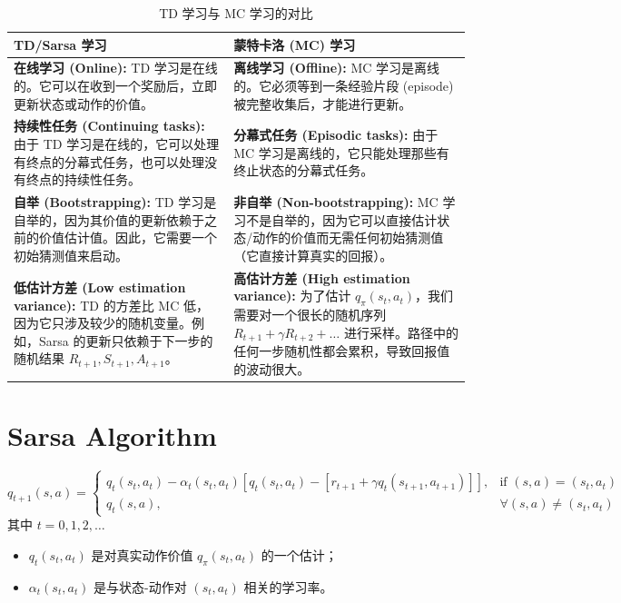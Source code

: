 \documentclass{article}
\begin{document}
\begin{table}[htbp] %
    \centering
    \caption{TD 学习与 MC 学习的对比}
    \label{tab:td_vs_mc_full}
    \begin{tabularx}{\textwidth}{XX} %
        \toprule
        \textbf{TD/Sarsa 学习} & \textbf{蒙特卡洛 (MC) 学习} \\
        \midrule
        \textbf{在线学习 (Online):} TD 学习是在线的。它可以在收到一个奖励后，立即更新状态或动作的价值。 & \textbf{离线学习 (Offline):} MC 学习是离线的。它必须等到一条经验片段 (episode) 被完整收集后，才能进行更新。 \\
        
        \addlinespace %
        
        \textbf{持续性任务 (Continuing tasks):} 由于 TD 学习是在线的，它可以处理有终点的分幕式任务，也可以处理没有终点的持续性任务。 & \textbf{分幕式任务 (Episodic tasks):} 由于 MC 学习是离线的，它只能处理那些有终止状态的分幕式任务。 \\
        
        \addlinespace
        
        \textbf{自举 (Bootstrapping):} TD 学习是自举的，因为其价值的更新依赖于之前的价值估计值。因此，它需要一个初始猜测值来启动。 & \textbf{非自举 (Non-bootstrapping):} MC 学习不是自举的，因为它可以直接估计状态/动作的价值而无需任何初始猜测值（它直接计算真实的回报）。 \\
        
        \addlinespace
        
        \textbf{低估计方差 (Low estimation variance):} TD 的方差比 MC 低，因为它只涉及较少的随机变量。例如，Sarsa 的更新只依赖于下一步的随机结果 $R_{t+1}, S_{t+1}, A_{t+1}$。 & \textbf{高估计方差 (High estimation variance):} 为了估计 $q_\pi(s_t, a_t)$，我们需要对一个很长的随机序列 $R_{t+1} + \gamma R_{t+2} + \dots$ 进行采样。路径中的任何一步随机性都会累积，导致回报值的波动很大。 \\
        \bottomrule
    \end{tabularx}
\end{table}
\section{Sarsa Algorithm}
\[
q_{t+1}(s, a) =
\begin{cases}
    q_t(s_t, a_t) - \alpha_t(s_t, a_t) \left[ q_t(s_t, a_t) - [r_{t+1} + \gamma q_t(s_{t+1}, a_{t+1})] \right], & \text{if } (s,a) = (s_t, a_t) \\
    q_t(s, a), & \forall (s, a) \neq (s_t, a_t)
\end{cases}
\]
其中 $t=0, 1, 2, \dots$
\begin{itemize}
    \item $q_t(s_t, a_t)$ 是对真实动作价值 $q_{\pi}(s_t, a_t)$ 的一个估计；
    \item $\alpha_t(s_t, a_t)$ 是与状态-动作对 $(s_t, a_t)$ 相关的学习率。
\end{itemize}
\end{document}
